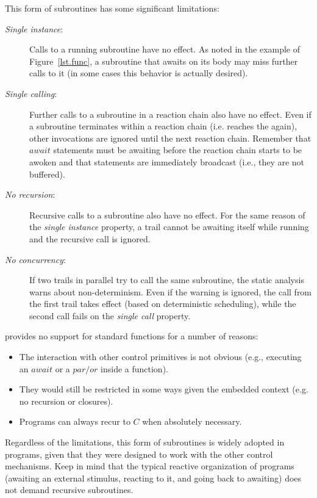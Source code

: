 This form of subroutines has some significant limitations:

\begin{description}
\item[\emph{Single instance}:] Calls to a running subroutine have no effect.
As noted in the example of Figure~\ref{lst.func}, a subroutine that awaits on 
its body may miss further calls to it (in some cases this behavior is actually 
desired).
%
\item[\emph{Single calling}:] Further calls to a subroutine in a reaction chain 
also have no effect.
Even if a subroutine terminates within a reaction chain (i.e. reaches the 
 again), other  invocations are ignored until the next 
reaction chain.
Remember that $await$ statements must be awaiting before the reaction chain 
starts to be awoken and that  statements are immediately broadcast 
(i.e., they are not buffered).
%
\item[\emph{No recursion}:] Recursive calls to a subroutine also have no 
effect.
For the same reason of the \emph{single instance} property, a trail cannot be 
awaiting itself while running and the recursive call is ignored.
%
\item[\emph{No concurrency}:] If two trails in parallel try to call the same 
subroutine, the static analysis warns about non-determinism.
Even if the warning is ignored, the call from the first trail takes effect 
(based on deterministic scheduling), while the second call fails on the 
\emph{single call} property.
\end{description}

\vspace{5pt}
\CEU provides no support for standard functions for a number of reasons:
\begin{itemize}
\item The interaction with other \CEU control primitives is not obvious (e.g., 
executing an $await$ or a $par/or$ inside a function).
\item They would still be restricted in some ways given the embedded context 
(e.g. no recursion or closures).
\item Programs can always recur to $C$ when absolutely necessary.
\end{itemize}

Regardless of the limitations, this form of subroutines is widely adopted in 
\CEU programs, given that they were designed to work with the other control 
mechanisms.
Keep in mind that the typical reactive organization of programs (awaiting an 
external stimulus, reacting to it, and going back to awaiting) does not demand 
recursive subroutines.

